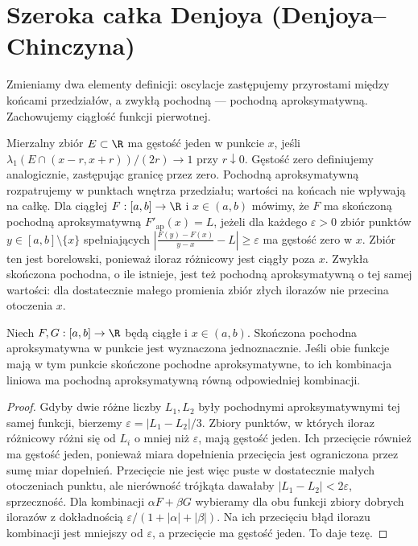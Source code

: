 \section{Szeroka całka Denjoya (Denjoya--Chinczyna)}
\providecommand{\atlasref}[2]{#2}
Zmieniamy dwa elementy definicji: oscylacje zastępujemy przyrostami między końcami przedziałów, a zwykłą pochodną --- pochodną aproksymatywną. Zachowujemy ciągłość funkcji pierwotnej.
\begin{definicja}\label{it:def:approx-derivative}
Mierzalny zbiór $E\subset\R$ ma gęstość jeden w punkcie $x$, jeśli $\lambda_1(E\cap(x-r,x+r))/(2r)\to1$ przy $r\downarrow0$. Gęstość zero definiujemy analogicznie, zastępując granicę przez zero. Pochodną aproksymatywną rozpatrujemy w punktach wnętrza przedziału; wartości na końcach nie wpływają na całkę. Dla ciągłej $F:[a,b]\to\R$ i $x\in(a,b)$ mówimy, że $F$ ma skończoną pochodną aproksymatywną $F'_{\mathrm{ap}}(x)=L$, jeżeli dla każdego $\varepsilon>0$ zbiór punktów $y\in[a,b]\setminus\{x\}$ spełniających
$\left|\frac{F(y)-F(x)}{y-x}-L\right|\ge\varepsilon$ ma gęstość zero w $x$. Zbiór ten jest borelowski, ponieważ iloraz różnicowy jest ciągły poza $x$. Zwykła skończona pochodna, o ile istnieje, jest też pochodną aproksymatywną o tej samej wartości: dla dostatecznie małego promienia zbiór złych ilorazów nie przecina otoczenia $x$.
\end{definicja}
\begin{lemat}\label{it:lem:approx-derivative}
Niech $F,G:[a,b]\to\R$ będą ciągłe i $x\in(a,b)$. Skończona pochodna aproksymatywna w punkcie jest wyznaczona jednoznacznie. Jeśli obie funkcje mają w tym punkcie skończone pochodne aproksymatywne, to ich kombinacja liniowa ma pochodną aproksymatywną równą odpowiedniej kombinacji.
\end{lemat}
\begin{proof}
Gdyby dwie różne liczby $L_1,L_2$ były pochodnymi aproksymatywnymi tej samej funkcji, bierzemy $\varepsilon=|L_1-L_2|/3$. Zbiory punktów, w których iloraz różnicowy różni się od $L_i$ o mniej niż $\varepsilon$, mają gęstość jeden. Ich przecięcie również ma gęstość jeden, ponieważ miara dopełnienia przecięcia jest ograniczona przez sumę miar dopełnień. Przecięcie nie jest więc puste w dostatecznie małych otoczeniach punktu, ale nierówność trójkąta dawałaby $|L_1-L_2|<2\varepsilon$, sprzeczność.
Dla kombinacji $\alpha F+\beta G$ wybieramy dla obu funkcji zbiory dobrych ilorazów z dokładnością $\varepsilon/(1+|\alpha|+|\beta|)$. Na ich przecięciu błąd ilorazu kombinacji jest mniejszy od $\varepsilon$, a przecięcie ma gęstość jeden. To daje tezę.
\end{proof}

